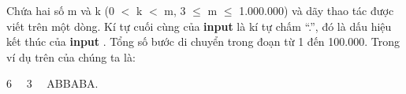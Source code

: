 Chứa hai số m và k (0 $<$ k $<$ m, 3  $\le$  m  $\le$  1.000.000) và dãy thao tác được viết trên một dòng. Kí tự cuối cùng của \textbf{input} là kí tự chấm “.”, đó là dấu hiệu kết thúc của \textbf{input} . Tổng số bước di chuyển trong đoạn từ 1 đến 100.000. Trong ví dụ trên của chúng ta là:

6   3   ABBABA.